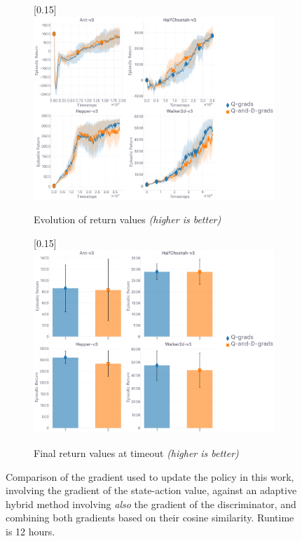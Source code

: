 \begin{figure}[H]
  \center
  \begin{subfigure}[t]{0.49\textwidth}
    \center\scalebox{0.15}[0.15]{\includegraphics{Plots/fig12_ada_4envs/plots_eval_env_ret_plot.pdf}}
    \caption{Evolution of return values \textit{(higher is better)}}
  \end{subfigure}
  \begin{subfigure}[t]{0.49\textwidth}
    \center\scalebox{0.15}[0.15]{\includegraphics{Plots/fig12_ada_4envs/plots_eval_env_ret_barplot.pdf}}
    \caption{Final return values at timeout \textit{(higher is better)}}
  \end{subfigure}
  \caption{
  Comparison of the gradient used to update the policy in this work,
  involving the gradient of the state-action value,
  against an adaptive hybrid method involving \emph{also}
  the gradient of the discriminator, and combining both gradients
  based on their cosine similarity.
  Runtime is 12 hours.}
  \label{cosimplots}
\end{figure}


